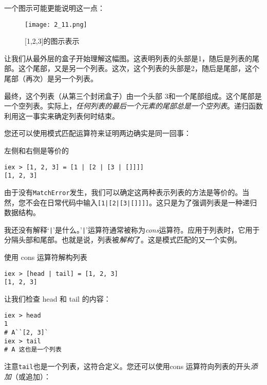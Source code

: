 一个图示可能更能说明这一点：

\begin{figure}[!ht]
    \centering
    \texttt{[image: 2\_11.png]}
    \caption{[1,2,3]的图示表示}
    \label{fig:2_11}
\end{figure}


让我们从最外层的盒子开始理解这幅图。这表明列表的头部是1，随后是列表的尾部。这个尾部，又是另一个列表。这次，这个列表的头部是2，随后是尾部，这个尾部（再次）是另一个列表。

最终，这个列表（从第三个封闭盒子）由一个头部 3和一个尾部组成。这个尾部是一个空列表。实际上，\emph{任何列表的最后一个元素的尾部总是一个空列表}。递归函数利用这一事实来确定列表何时结束。

您还可以使用模式匹配运算符来证明两边确实是同一回事：

\begin{code}{左侧和右侧是等价的}
\begin{verbatim}
iex > [1, 2, 3] = [1 | [2 | [3 | []]]]
[1, 2, 3]
\end{verbatim}
\label{lst:left_and_right_are_equivalent}
\end{code}

由于没有\texttt{MatchError}发生，我们可以确定这两种表示列表的方法是等价的。当然，您不会在日常代码中输入\texttt{[1|[2|[3|[]]]]}。这只是为了强调列表是一种递归数据结构。

我还没有解释`\texttt{|}'是什么。'\texttt{|}'运算符通常被称为\emph{cons}运算符。应用于列表时，它用于分隔头部和尾部。也就是说，列表被\emph{解构}了。这是模式匹配的又一个实例。

\begin{code}{使用 cons 运算符解构列表}
\begin{verbatim}
iex > [head | tail] = [1, 2, 3]
[1, 2, 3]
\end{verbatim}
\label{lst:use_the_cons_operator_to_destructure_a_list}
\end{code}

让我们检查 head 和 tail 的内容：

\begin{code}{}
\begin{verbatim}
iex > head
1
# A``[2, 3]`
iex > tail
# A 这也是一个列表
\end{verbatim}
\end{code}

注意\texttt{tail}也是一个列表，这符合定义。您还可以使用cons 运算符向列表的开头\emph{添加}（或追加）：

